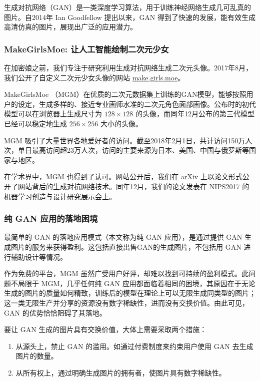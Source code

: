 \documentclass[a4paper]{article}
\begin{document}
生成对抗网络（GAN）\cite{goodfellow2014generative}是一类深度学习算法，用于训练神经网络生成几可乱真的图片。自2014年 Ian Goodfellow 提出以来，GAN 得到了快速的发展，能有效生成高清仿真的图片\cite{radford2015unsupervised,karras2017progressive}，展现出广泛的应用潜力。

\subsubsection{MakeGirlsMoe: 让人工智能绘制二次元少女}

在加密娘之前，我们专注于研究利用生成对抗网络生成二次元头像。2017年8月，我们公开了自定义二次元少女头像的网站 \href{http://make.girls.moe/#/}{make.girls.moe}。

MakeGirlsMoe （MGM）在优质的二次元数据集上训练的GAN模型，能够按照用户的设定，生成多样的、接近专业画师水准的二次元角色面部画像。公布时的初代模型可以在浏览器上生成尺寸为 $128 \times 128$ 的头像，而同年12月公布的第三代模型已经可以稳定地生成 $256 \times 256$ 大小的头像。

MGM 吸引了大量世界各地爱好者的访问。截至2018年2月1日，共计访问150万人次，单日最高访问超23万人次，访问的主要来源为日本、美国、中国与俄罗斯等国家与地区。

在学术界中，MGM 也得到了认可。网站公开后，我们在 arXiv 上以论文形式\cite{jin2017towards}公开了网站背后的生成对抗网络技术。同年12月，我们的论文\href{https://nips2017creativity.github.io/}{发表在 NIPS2017 的机器学习创造与设计研究展示会上}。

\subsubsection{纯 GAN 应用的落地困境}

最简单的 GAN 的落地应用模式（本文称为纯 GAN 应用），是通过提供 GAN 生成图片的服务来获得盈利。这包括直接出售GAN的生成图片，不包括用 GAN 进行辅助设计等情况。

作为免费的平台，MGM 虽然广受用户好评，却难以找到可持续的盈利模式。此问题不局限于 MGM，几乎任何纯 GAN 应用都面临着相同的困境，其原因在于无论生成的图片的质量如何精致，训练后的模型在理论上可以无限生成同类型的图片；这一类无限生产并分享的资源没有数字稀缺性，进而没有交换价值。由此可见，GAN 的优势恰恰阻碍了其落地。

要让 GAN 生成的图片具有交换价值，大体上需要采取两个措施：

\begin{enumerate}
\item 从源头上，禁止 GAN 的滥用。如通过付费制度来约束用户使用 GAN 去生成图片的数量。
\item 从所有权上，通过明确生成图片的拥有者，使图片具有数字稀缺性。
\end{enumerate}
\end{document}
